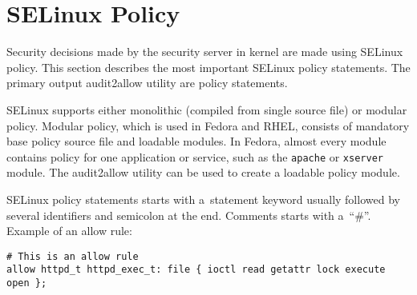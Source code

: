 \section{SELinux Policy}
\label{policy}
Security decisions made by the security server in kernel are made using
SELinux policy. This section describes the most important SELinux policy
statements. The primary output audit2allow utility are policy statements.

SELinux supports either monolithic (compiled from single source file) or modular
policy. Modular policy, which is used in Fedora and RHEL, consists of mandatory
base policy source file and loadable modules. In Fedora, almost every module
contains policy for one application or service, such as the \texttt{apache} or
\texttt{xserver} module. The audit2allow utility can be used to create a
loadable policy module.

SELinux policy statements starts with a~statement keyword usually followed by
several identifiers and semicolon at the end. Comments starts with a~``\#''.
Example of an allow rule:

\begin{lstlisting}[language=te]
# This is an allow rule
allow httpd_t httpd_exec_t: file { ioctl read getattr lock execute open };
\end{lstlisting}

